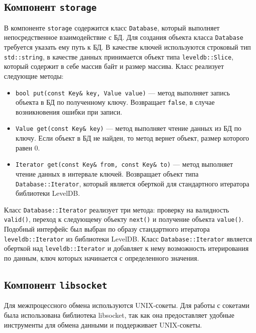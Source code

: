 \subsection{Компонент \texttt{storage}}
В компоненте \texttt{storage} содержится класс \texttt{Database}, который выполняет непосредственное взаимодействие с БД. Для создания объекта класса \texttt{Database} требуется указать ему путь к БД. В качестве ключей используются строковый тип \texttt{std::string}, в качестве данных принимается объект типа \texttt{leveldb::Slice}, который содержит в себе массив байт и размер массива. Класс реализует следующие методы:
\begin{itemize}
\item \texttt{bool put(const Key\& key, Value value)} --- метод выполняет запись объекта в БД по полученному ключу. Возвращает \texttt{false}, в случае возникновения ошибки при записи.
\item \texttt{Value get(const Key\& key)} --- метод выполняет чтение данных из БД по ключу. Если объект в БД не найден, то метод вернет объект, размер которого равен 0.
\item \texttt{Iterator get(const Key\& from, const Key\& to)} --- метод выполняет чтение данных в интервале ключей. Возвращает объект типа \texttt{Database::Iterator}, который является оберткой для стандартного итератора библиотеки LevelDB.
\end{itemize}

Класс \texttt{Database::Iterator} реализует три метода: проверку на валидность \texttt{valid()}, переход к следующему объекту \texttt{next()} и получение объекта \texttt{value()}. Подобный интерфейс был выбран по образу стандартного итератора \texttt{leveldb::Iterator} из библиотеки LevelDB. Класс \texttt{Database::Iterator} является оберткой над \texttt{leveldb::Iterator} и добавляет к нему возможность итерирования по данным, ключ которых начинается с определенного значения.

\subsection{Компонент \texttt{libsocket}}
Для межпроцессного обмена используются UNIX-сокеты. Для работы с сокетами была использована библиотека libsocket\cite{libsocket}, так как она предоставляет удобные инструменты для обмена данными и поддерживает UNIX-сокеты.

